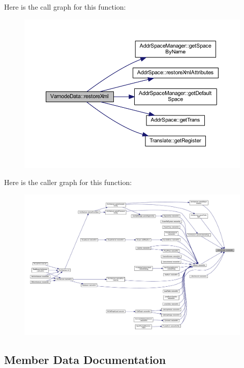 Here is the call graph for this function\+:
\nopagebreak
\begin{figure}[H]
\begin{center}
\leavevmode
\includegraphics[width=350pt]{struct_varnode_data_a20a4c1ccbaa1f2477d036be8be923894_cgraph}
\end{center}
\end{figure}
Here is the caller graph for this function\+:
\nopagebreak
\begin{figure}[H]
\begin{center}
\leavevmode
\includegraphics[width=350pt]{struct_varnode_data_a20a4c1ccbaa1f2477d036be8be923894_icgraph}
\end{center}
\end{figure}


\subsection{Member Data Documentation}
\mbox{\label{struct_varnode_data_a1a511384ee72e847b51423cc99c8233e}} 
